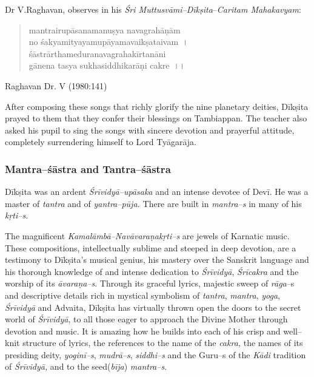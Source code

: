Dr V.Raghavan, observes in his \textit{Śri Muttusvāmi–Dīkṣita}–\textit{Caritam Mahakavyam}:

\begin{verse}
mantrairupāsanamanuṣya navagrahāṇām\\ no śakyamityayamupāyamavaikṣataivam~।\\ śāstrārthameduranavagrahakīrtanāni\\ gānena tasya sukhasiddhikarāṇi cakre~।।
\end{verse}

\begin{flushright}
Raghavan Dr. V (1980:141)
\end{flushright}

After composing these songs that richly glorify the nine planetary deities, Dīkṣita prayed to them that they confer their blessings on Tambiappan. The teacher also asked his pupil to sing the songs with sincere devotion and prayerful attitude, completely surrendering himself to Lord Tyāgarāja.


\subsubsection*{Mantra–śāstra and Tantra–śāstra}

Dīkṣita was an ardent \textit{Śrīvidyā–upāsaka} and an intense devotee of Devī. He was a master of \textit{tantra} and of \textit{yantra–pūja.} There are built in \textit{mantra–s} in many of his \textit{kṛti–s}.

The magnificent \textit{Kamalāmbā–Navāvaraṇakṛti–s} are jewels of Karnatic music. These compositions, intellectually sublime and steeped in deep devotion, are a testimony to Dīkṣita’s musical genius, his mastery over the Sanskrit language and his thorough knowledge of and intense dedication to \textit{Śrīvidyā}, \textit{Śrīcakra} and the worship of its \textit{āvaraṇa–s}. Through its graceful lyrics, majestic sweep of \textit{rāga}–s and descriptive details rich in mystical symbolism of \textit{tantra}, \textit{mantra}, \textit{yoga}, \textit{Śrīvidyā} and Advaita, Dīkṣita has virtually thrown open the doors to the secret world of \textit{Śrīvidyā}, to all those eager to approach the Divine Mother through devotion and music. It is amazing how he builds into each of his crisp and well–knit structure of lyrics, the references to the name of the \textit{cakra,} the names of its presiding deity, \textit{yoginī–s}, \textit{mudrā–s}, \textit{siddhi–s} and the Guru–s of the \textit{Kādi} tradition of \textit{Śrīvidyā,} and to the seed(\textit{bīja}) \textit{mantra–s}.


